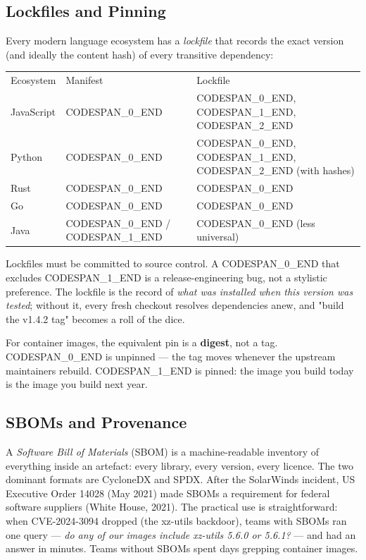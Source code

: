 \documentclass[11pt,a4paper]{book}
\begin{document}
\subsection{Lockfiles and Pinning}

Every modern language ecosystem has a \textit{lockfile} that records the exact version (and ideally the content hash) of every transitive dependency:

\begin{tabular}{lll}
\hline
Ecosystem & Manifest & Lockfile \\
JavaScript & CODESPAN\_0\_END & CODESPAN\_0\_END, CODESPAN\_1\_END, CODESPAN\_2\_END \\
Python & CODESPAN\_0\_END & CODESPAN\_0\_END, CODESPAN\_1\_END, CODESPAN\_2\_END (with hashes) \\
Rust & CODESPAN\_0\_END & CODESPAN\_0\_END \\
Go & CODESPAN\_0\_END & CODESPAN\_0\_END \\
Java & CODESPAN\_0\_END / CODESPAN\_1\_END & CODESPAN\_0\_END (less universal) \\
\hline
\end{tabular}

Lockfiles must be committed to source control. A CODESPAN\_0\_END that excludes CODESPAN\_1\_END is a release-engineering bug, not a stylistic preference. The lockfile is the record of \textit{what was installed when this version was tested}; without it, every fresh checkout resolves dependencies anew, and "build the v1.4.2 tag" becomes a roll of the dice.

For container images, the equivalent pin is a \textbf{digest}, not a tag. CODESPAN\_0\_END is unpinned --- the tag moves whenever the upstream maintainers rebuild. CODESPAN\_1\_END is pinned: the image you build today is the image you build next year.

\subsection{SBOMs and Provenance}

A \textit{Software Bill of Materials} (SBOM) is a machine-readable inventory of everything inside an artefact: every library, every version, every licence. The two dominant formats are CycloneDX and SPDX. After the SolarWinds incident, US Executive Order 14028 (May 2021) made SBOMs a requirement for federal software suppliers (White House, 2021). The practical use is straightforward: when CVE-2024-3094 dropped (the xz-utils backdoor), teams with SBOMs ran one query --- \textit{do any of our images include xz-utils 5.6.0 or 5.6.1?} --- and had an answer in minutes. Teams without SBOMs spent days grepping container images.
\end{document}
